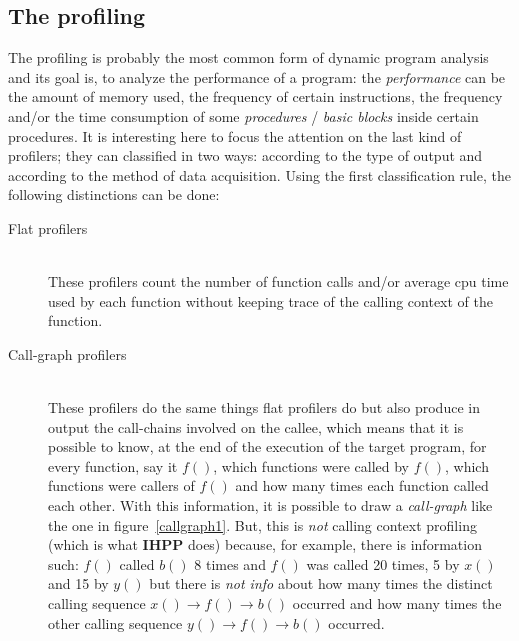 \documentclass[a4paper,10pt]{report}
\begin{document}
\subsection{The profiling}
The profiling is probably the most common form of dynamic program analysis and
its goal is, to analyze the performance of a program: the
\emph{performance} can be the amount of memory used, the frequency of certain
instructions, the frequency and/or the time consumption of some
\emph{procedures} / \emph{basic blocks} inside certain procedures. 
It is interesting here to focus the attention on the last kind of profilers; 
they can classified in two ways: according to the type of output and according to the method of data acquisition. Using the first classification rule, the following distinctions can be done:

\begin{description}
\item[Flat profilers] \hfill \\
These profilers count the number of function calls and/or average cpu time used
by each function without keeping trace of the calling context of the function.
\item[Call-graph profilers] \hfill \\
These profilers do the same things flat profilers do but also produce in output
the call-chains involved on the callee, which means that it is possible to know,
at the end of the execution of the target program, for every function, say it
$f()$, which functions were called by $f()$, which functions were
callers of $f()$ and how many times each function called each other. With this
information, it is possible to draw a
\emph{call-graph} like the one in figure~\ref{callgraph1}. But, this is
\emph{not} calling context profiling (which is what \textbf{IHPP} does) because,
for example, there is information such: $f()$ called $b()$ 8 times and $f()$ was called 20
times, 5 by $x()$ and 15 by $y()$ but there is \emph{not info} about how many times the
distinct calling sequence $x()\rightarrow f()\rightarrow b()$ occurred and how
many times the other calling sequence $y()\rightarrow f()\rightarrow b()$
occurred.

\begin{figure}

\begin{center}

\begin{tikzpicture}
[->,>=stealth',shorten >=1pt,
node distance=1.5cm,
minimum size=7mm,
main node/.style={circle, draw, font=\itshape\large}]


\end{tikzpicture}
\end{center}
\end{figure}
\end{description}
\end{document}
